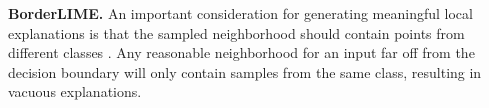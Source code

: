 



\textbf{BorderLIME.} An important consideration for generating meaningful local explanations is that the sampled neighborhood should contain points from different classes \cite{laugel2018defining}. Any reasonable neighborhood for an input far off from the decision boundary will only contain samples from the same class, resulting in vacuous explanations.


